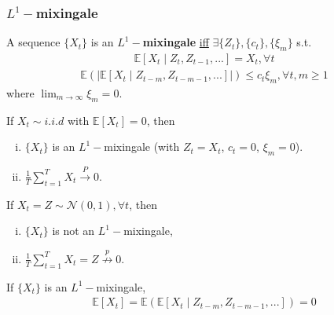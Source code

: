\documentclass[11pt]{elegantbook}
\begin{document}
\subsubsection*{$L^1-$mixingale}
\begin{definition}[$L^1-$mixingale]\label{def:mixingale}
    A sequence $\{X_t\}$ is an \textbf{$L^1-$mixingale} \underline{iff} $\exists\{Z_t\},\{c_t\},\{\xi_m\}$ s.t.
    \begin{equation}
        \begin{aligned}
            \mathbb{E}[X_t\mid Z_t,Z_{t-1},...]=X_t,\forall t
        \end{aligned}
        \label{def:mixingale_1}
    \end{equation}
    \begin{equation}
        \begin{aligned}
            \mathbb{E}\left(|\mathbb{E}[X_t\mid Z_{t-m},Z_{t-m-1},...]|\right)\leq c_t\xi_m,\forall t,m\geq 1
        \end{aligned}
        \label{def:mixingale_2}
    \end{equation}
    where $\lim_{m \rightarrow \infty}\xi_m =0$.
\end{definition}
\begin{lemma}
    If $X_t\sim i.i.d$ with $\mathbb{E}[X_t]=0$, then
    \begin{enumerate}[(i).]
        \item $\{X_t\}$ is an $L^1-$mixingale (with $Z_t=X_t$, $c_t=0$, $\xi_m=0$).
        \item $\frac{1}{T}\sum_{t=1}^T X_t \stackrel{P}{\longrightarrow} 0$.
    \end{enumerate}
    If $X_t=Z\sim \mathcal{N}(0,1),\forall t$, then
    \begin{enumerate}[(i).]
        \item $\{X_t\}$ is not an $L^1-$mixingale,
        \item $\frac{1}{T}\sum_{t=1}^T X_t = Z \stackrel{p}{\nrightarrow} 0$.
    \end{enumerate}
    If $\{X_t\}$ is an $L^1-$mixingale,
    \begin{equation}
        \begin{aligned}
            \mathbb{E}[X_t]=\mathbb{E}\left(\mathbb{E}[X_t\mid Z_{t-m},Z_{t-m-1},...]\right)=0
        \end{aligned}
        \nonumber
    \end{equation}
\end{lemma}
\end{document}
